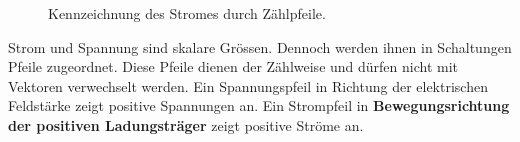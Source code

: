 \begin{figure}[H]
\centering
\caption{Kennzeichnung des Stromes durch Zählpfeile.}
\label{fig_IIIb}
\end{figure}
\noindent Strom und Spannung sind skalare Grössen. Dennoch werden ihnen in Schaltungen Pfeile zugeordnet. Diese Pfeile dienen der Zählweise und dürfen nicht mit Vektoren verwechselt werden. Ein Spannungspfeil in Richtung der elektrischen Feldstärke zeigt positive Spannungen an. Ein Strompfeil in \textbf{Bewegungsrichtung der positiven Ladungsträger} zeigt positive Ströme an.
